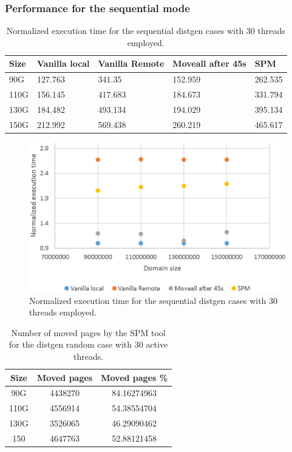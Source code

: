 \subsubsection{Performance for the sequential mode}\label{subsection:time-dgenat-seq.eps}

\begin{table}[th]
	\centering
		\begin{tabularx}{\textwidth}{|l|l|l|l|X|}
		\hline
			Size & Vanilla local & Vanilla Remote & Moveall after 45s & SPM \\
			\hline
			90G & 127.763 & 341.35 & 152.959 & 262.535\\
			\hline
			110G & 156.145 & 417.683 & 184.673 & 331.794\\
			\hline
			130G & 184.482 & 493.134 & 194.029 & 395.134\\
			\hline
			150G & 212.992 & 569.438 & 260.219 & 465.617\\
			\hline
		\end{tabularx}
		\caption{Normalized execution time for the sequential distgen cases with 30 threads employed.}
		\label{table:res-dgentimserat}
\end{table}

\begin{figure}[th]
	\centering
		\includegraphics[width=.8\textwidth]{figures/time-dgenatt-ser.eps}
		\caption{Normalized execution time for the sequential distgen cases with 30 threads employed.}
		\label{fig:time-dgenatt-ser}
\end{figure}

\begin{table}[th]
	\centering
		\begin{tabularx}{.6\textwidth}{|c|c|c}
		\hline
			Size & Moved pages & Moved pages \%  \\
			\hline
			90G & 4438270 & 84.16274963 \\
			\hline
			110G & 4556914 & 54.38554704 \\
			\hline
			130G & 3526065 & 46.29090462 \\
			\hline
			150 & 4647763 & 52.88121458 \\
			\hline
		\end{tabularx}
		\caption{Number of moved pages by the SPM tool for the distgen random case with 30 active threads.}
		\label{table:res-tbl-dgenmvdrdmat}
\end{table}


